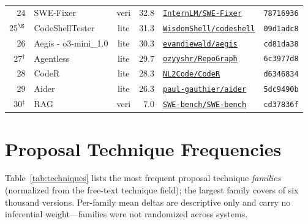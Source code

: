\begin{table}[H]
\begin{tabular}{rlcrlc}
24 & SWE-Fixer & veri & 32.8 & \href{https://github.com/InternLM/SWE-Fixer}{\texttt{InternLM/SWE-Fixer}} & \texttt{78716936} \\
25$^{\S}$ & CodeShellTester & lite & 31.3 & \href{https://github.com/WisdomShell/codeshell}{\texttt{WisdomShell/codeshell}} & \texttt{09d1adc8} \\
26 & Aegis - o3-mini\_1.0 & lite & 30.3 & \href{https://github.com/evandiewald/aegis}{\texttt{evandiewald/aegis}} & \texttt{cd81da38} \\
27$^{\dagger}$ & Agentless & lite & 29.7 & \href{https://github.com/ozyyshr/RepoGraph}{\texttt{ozyyshr/RepoGraph}} & \texttt{6c3977d8} \\
28 & CodeR & lite & 28.3 & \href{https://github.com/NL2Code/CodeR}{\texttt{NL2Code/CodeR}} & \texttt{d6346834} \\
29 & Aider & lite & 26.3 & \href{https://github.com/paul-gauthier/aider}{\texttt{paul-gauthier/aider}} & \texttt{5dc9490b} \\
30$^{\ddagger}$ & RAG & veri & 7.0 & \href{https://github.com/SWE-bench/SWE-bench}{\texttt{SWE-bench/SWE-bench}} & \texttt{cd37836f} \\
\bottomrule
\end{tabular}
\end{table}

\clearpage
\section{Proposal Technique Frequencies}
\label{app:tech}
Table~\ref{tab:techniques} lists the most frequent proposal technique
\emph{families} (normalized from the free-text technique field); the largest
family covers \swTechTopN{} of six thousand versions. Per-family mean deltas
are descriptive only and carry no inferential weight---families were not
randomized across systems.

\begin{table}[H]\centering
\caption{Most frequent proposal technique families over all six thousand
why-records; $n$ is the Versions column. Descriptive only: families were not
randomized, so the mean $\Delta$ (\textsc{rubric}) carries no causal claim.}
\label{tab:techniques}\footnotesize
\setlength{\tabcolsep}{4pt}

\end{table}

\clearpage

